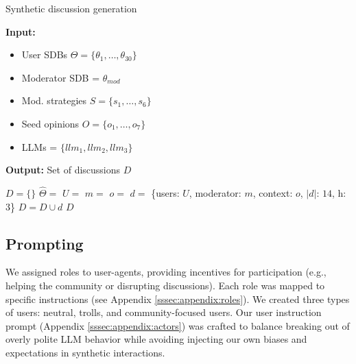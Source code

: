 \begin{algorithm}[t]
\caption{Synthetic discussion generation}
\label{alg:exp_generation}
\hspace*{\algorithmicindent} \textbf{Input:} 
         \begin{itemize}[noitemsep, nosep]
             \item User \acp{SDB} $\Theta = \{\theta_1, \dots, \theta_{30}\}$
             \item Moderator \ac{SDB} = $\theta_{mod}$
             \item Mod. strategies $S = \{s_1, \ldots, s_6\}$
             \item Seed opinions $O = \{o_1, \ldots, o_7\}$
             \item \acp{LLM} = $\{llm_1, llm_2, llm_3\}$
         \end{itemize}
         \hspace*{\algorithmicindent} \textbf{Output:} Set of discussions $D$
\begin{algorithmic}[1]
    \State $D = \{\}$
                \State $\hat{\Theta} = $ 
                \State $U =$  
                \State $m = $ 
                \State $o = $ 
                \State $d =$ \{users: $U$, moderator: $m$, context: $o$, $\vert d \rvert$: $14$, h: $3$\}
                \State $D = D \cup d$
            \EndFor
        \EndFor
    \EndFor
    \State \Return $D$
\end{algorithmic}
\end{algorithm}


\subsection{Prompting}
\label{ssec:experimental:prompts}

We assigned roles to user-agents, providing incentives for participation (e.g., helping the community or disrupting discussions). Each role was mapped to specific instructions (see Appendix \ref{sssec:appendix:roles}). We created three types of users: neutral, trolls, and community-focused users. Our user instruction prompt (Appendix \ref{sssec:appendix:actors}) was crafted to balance breaking out of overly polite \ac{LLM} behavior while avoiding injecting our own biases and expectations in synthetic interactions. 

